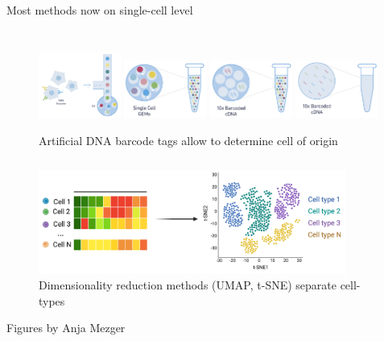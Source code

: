 \documentclass[10pt]{beamer}
\newcommand{\credit}[1]{{\vspace{\fill} \par \raggedleft \scriptsize \mdseries \color{mDarkBrown} #1 \par}}
\begin{document}
\begin{frame}{Most methods now on single-cell level}
	\begin{columns}[T]
		\column{\dimexpr\paperwidth-10pt}
		\begin{figure}
			\includegraphics[width=0.24\textwidth]{./figures/single-cell-B-oil.png}
			\includegraphics[width=0.24\textwidth]{./figures/single-cell-B-oil2.png}
			\includegraphics[width=0.24\textwidth]{./figures/single-cell-B-oil3.png}
			\includegraphics[width=0.24\textwidth]{./figures/single-cell-B-oil4.png}
			\caption{Artificial DNA barcode tags allow to determine cell of origin}
		\end{figure}
	\end{columns}
	\begin{figure}
		\includegraphics[width=0.9\textwidth]{./figures/single-cell4.png}
		\caption{Dimensionality reduction methods (UMAP, t-SNE) separate cell-types}
	\end{figure}
	\credit{Figures by Anja Mezger}
\end{frame}
\end{document}
